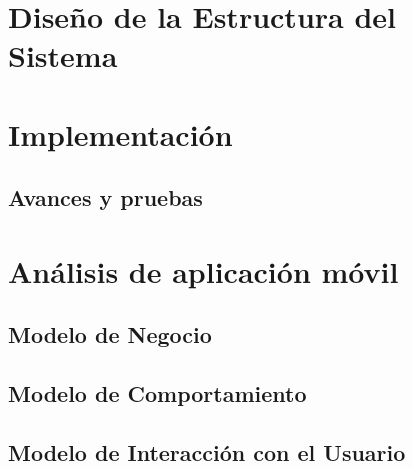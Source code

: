 \documentclass[12pt]{book}
\begin{document}
\part{Diseño de la Estructura del Sistema}


\part{Implementación}
\chapter{Avances y pruebas}\label{chp:avancesPruebas}



\appendix
\part{Análisis de aplicación móvil}
\chapter{Modelo de Negocio}\label{chp:modeloNegocios}
\chapter{Modelo de Comportamiento}
\chapter{Modelo de Interacción con el Usuario}

\newpage
\renewcommand{\bibname}{Referencias}
%
%


\end{document}
